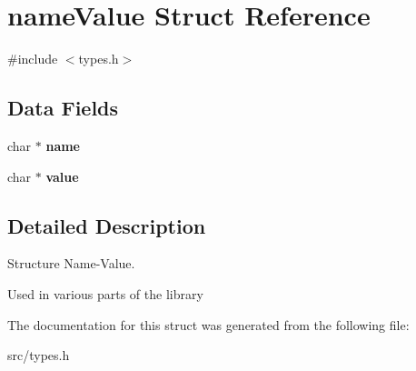 \hypertarget{structnameValue}{
\section{nameValue Struct Reference}
\label{structnameValue}
}


{\ttfamily \#include $<$types.h$>$}

\subsection*{Data Fields}
\begin{DoxyCompactItemize}
\item 
\hypertarget{structnameValue_ac3d2c6752f76d0cc0f73c9af3dda4ed6}{
char $\ast$ {\bfseries name}}
\label{structnameValue_ac3d2c6752f76d0cc0f73c9af3dda4ed6}

\item 
\hypertarget{structnameValue_a926a0523281bb4ec2ad7acd24b28f8d9}{
char $\ast$ {\bfseries value}}
\label{structnameValue_a926a0523281bb4ec2ad7acd24b28f8d9}

\end{DoxyCompactItemize}


\subsection{Detailed Description}
Structure Name-\/Value. \par
 Used in various parts of the library 

The documentation for this struct was generated from the following file:\begin{DoxyCompactItemize}
\item 
src/types.h\end{DoxyCompactItemize}

